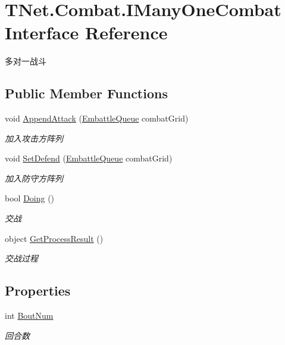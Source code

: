 \hypertarget{interface_t_net_1_1_combat_1_1_i_many_one_combat}{}\section{T\+Net.\+Combat.\+I\+Many\+One\+Combat Interface Reference}
\label{interface_t_net_1_1_combat_1_1_i_many_one_combat}


多对一战斗  


\subsection*{Public Member Functions}
\begin{DoxyCompactItemize}
\item 
void \mbox{\hyperlink{interface_t_net_1_1_combat_1_1_i_many_one_combat_ac44561bf4f6e75cf11ad7c78e66e2f52}{Append\+Attack}} (\mbox{\hyperlink{class_t_net_1_1_model_1_1_embattle_queue}{Embattle\+Queue}} combat\+Grid)
\begin{DoxyCompactList}\small\item\em 加入攻击方阵列 \end{DoxyCompactList}\item 
void \mbox{\hyperlink{interface_t_net_1_1_combat_1_1_i_many_one_combat_a108f9c107aa501a0ac8ce142f55ed5fe}{Set\+Defend}} (\mbox{\hyperlink{class_t_net_1_1_model_1_1_embattle_queue}{Embattle\+Queue}} combat\+Grid)
\begin{DoxyCompactList}\small\item\em 加入防守方阵列 \end{DoxyCompactList}\item 
bool \mbox{\hyperlink{interface_t_net_1_1_combat_1_1_i_many_one_combat_aafe2ff17f06448c807ee357a89617061}{Doing}} ()
\begin{DoxyCompactList}\small\item\em 交战 \end{DoxyCompactList}\item 
object \mbox{\hyperlink{interface_t_net_1_1_combat_1_1_i_many_one_combat_a9fa4b9eab10b757da41197b51dcef280}{Get\+Process\+Result}} ()
\begin{DoxyCompactList}\small\item\em 交战过程 \end{DoxyCompactList}\end{DoxyCompactItemize}
\subsection*{Properties}
\begin{DoxyCompactItemize}
\item 
int \mbox{\hyperlink{interface_t_net_1_1_combat_1_1_i_many_one_combat_a4a8f1d6dbfc7525385e4a93f76c87cbf}{Bout\+Num}}
\begin{DoxyCompactList}\small\item\em 回合数 \end{DoxyCompactList}\end{DoxyCompactItemize}


